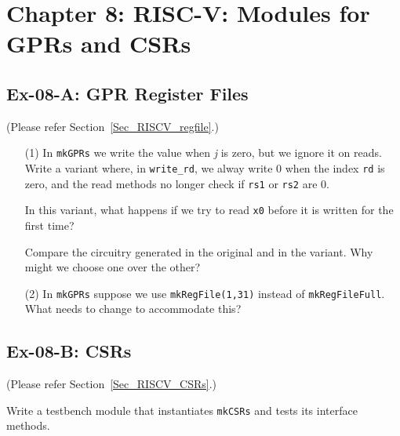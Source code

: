 
\hdivider

\section*{Chapter 8: RISC-V: Modules for GPRs and CSRs}


\subsection*{Ex-08-A: GPR Register Files}

\label{Ex-08-A-GPR-Register-Files}

(Please refer Section~\ref{Sec_RISCV_regfile}.)

\begin{itemize}

\item[(1)] In {\tt mkGPRs} we write the value when \emph{j} is zero, but we
      ignore it on reads.  Write a variant where, in {\tt write\_rd},
      we alway write 0 when the index {\tt rd} is zero, and the read
      methods no longer check if {\tt rs1} or {\tt rs2} are 0.

      In this variant, what happens if we try to read {\tt x0} before
      it is written for the first time?

      Compare the circuitry generated in the original and in the
      variant.  Why might we choose one over the other?

\item[(2)] In {\tt mkGPRs} suppose we use {\tt mkRegFile(1,31)} instead of
      {\tt mkRegFileFull}.  What needs to change to accommodate this?

\end{itemize}


\subsection*{Ex-08-B: CSRs}

\label{Ex-08-B-CSRs}

(Please refer Section~\ref{Sec_RISCV_CSRs}.)

Write a testbench module that instantiates {\tt mkCSRs} and tests its
interface methods.

